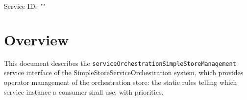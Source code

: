 \documentclass[a4paper]{arrowhead}
\begin{document}
\sloppy

\ArrowheadSetup

\begin{center}
  \vspace*{1cm}
  \huge{\arrowtitle}

  \vspace*{0.2cm}
  \LARGE{\arrowtype}
  \vspace*{1cm}

  \Large{Service ID: \textit{"\arrowid"}}

  \vspace*{\fill}


  \vspace*{1cm}
  \vspace*{\fill}

  \begin{abstract}
    This document describes the HTTP/1.1 protocol with TLS payload security and JSON payload encoding variant of the \texttt{service\allowbreak{}Orchestration\allowbreak{}Simple\allowbreak{}Store\allowbreak{}Management} service of the SimpleStoreServiceOrchestration system.
  \end{abstract}

  \vspace*{1cm}
\end{center}

\newpage

\tableofcontents
\newpage

\section{Overview}
\label{sec:overview}

This document describes the \texttt{service\allowbreak{}Orchestration\allowbreak{}Simple\allowbreak{}Store\allowbreak{}Management} service interface of the SimpleStoreServiceOrchestration system, which provides operator management of the orchestration store: the static rules telling which service instance a consumer shall use, with priorities.
\end{document}

